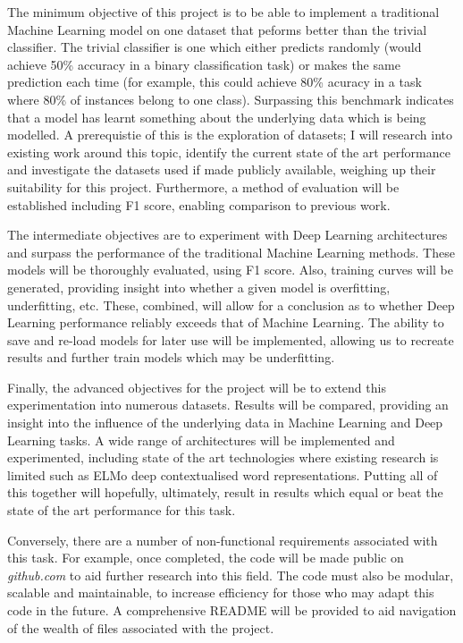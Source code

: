\documentclass[12pt,a4paper]{article}
\begin{document}
The minimum objective of this project is to be able to implement a traditional Machine Learning model on one dataset that peforms better than the trivial classifier. The trivial classifier is one which either predicts randomly (would achieve 50\% accuracy in a binary classification task) or makes the same prediction each time (for example, this could achieve 80\% acuracy in a task where 80\% of instances belong to one class). Surpassing this benchmark indicates that a model has learnt something about the underlying data which is being modelled. A prerequistie of this is the exploration of datasets; I will research into existing work around this topic, identify the current state of the art performance and investigate the datasets used if made publicly available, weighing up their suitability for this project. Furthermore, a method of evaluation will be established  including F1 score, enabling comparison to previous work.

The intermediate objectives are to experiment with Deep Learning architectures and surpass the performance of the traditional Machine Learning methods. These models will be thoroughly evaluated, using F1 score. Also, training curves will be generated, providing insight into whether a given model is overfitting, underfitting, etc. These, combined, will allow for a conclusion as to whether Deep Learning performance reliably exceeds that of Machine Learning. The ability to save and re-load models for later use will be implemented, allowing us to recreate results and further train models which may be underfitting.

Finally, the advanced objectives for the project will be to extend this experimentation into numerous datasets. Results will be compared, providing an insight into the influence of the underlying data in Machine Learning and Deep Learning tasks. A wide range of architectures will be implemented and experimented, including state of the art technologies where existing research is limited such as ELMo deep contextualised word representations. Putting all of this together will hopefully, ultimately, result in results which equal or beat the state of the art performance for this task.

Conversely, there are a number of non-functional requirements associated with this task. For example, once completed, the code will be made public on \textit{github.com} to aid further research into this field. The code must also be modular, scalable and maintainable, to increase efficiency for those who may adapt this code in the future. A comprehensive README will be provided to aid navigation of the wealth of files associated with the project.
\end{document}
